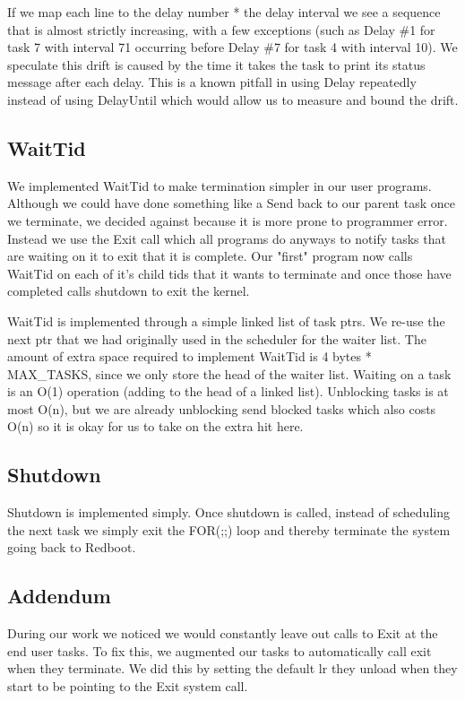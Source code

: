 \documentclass{article}
\begin{document}
If we map each line to the delay number * the delay interval we see a sequence that is almost strictly increasing, with a few exceptions (such as Delay \#1 for task 7 with interval 71 occurring before Delay \#7 for task 4 with interval 10).  We speculate this drift is caused by the time it takes the task to print its status message after each delay. This is a known pitfall in using Delay repeatedly instead of using DelayUntil which would allow us to measure and bound the drift. 

\subsection{WaitTid}

We implemented WaitTid to make termination simpler in our user programs. Although we could have done something like a Send back to our parent task once we terminate, we decided against because it is more prone to programmer error. Instead we use the Exit call which all programs do anyways to notify tasks that are waiting on it to exit that it is complete. Our "first" program now calls WaitTid on each of it's child tids that it wants to terminate and once those have completed calls shutdown to exit the kernel.

WaitTid is implemented through a simple linked list of task ptrs. We re-use the next ptr that we had originally used in the scheduler for the waiter list. The amount of extra space required to implement WaitTid is 4 bytes * MAX_TASKS, since we only store the head of the waiter list. Waiting on a task is an O(1) operation (adding to the head of a linked list). Unblocking tasks is at most O(n), but we are already unblocking send blocked tasks which also costs O(n) so it is okay for us to take on the extra hit here.

\subsection{Shutdown}

Shutdown is implemented simply. Once shutdown is called, instead of scheduling the next task we simply exit the FOR(;;) loop and thereby terminate the system going back to Redboot.

\subsection{Addendum}

During our work we noticed we would constantly leave out calls to Exit at the end user tasks. To fix this, we augmented our tasks to automatically call exit when they terminate. We did this by setting the default lr they unload when they start to be pointing to the Exit system call.
\end{document}
